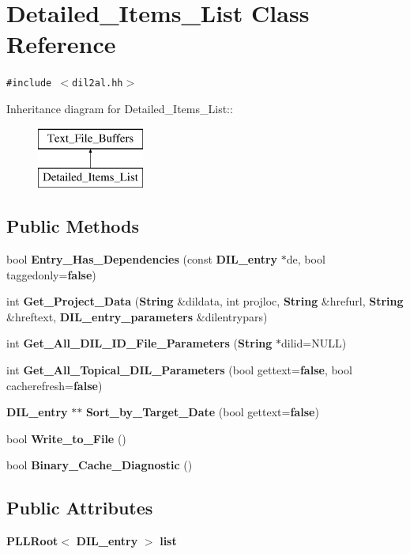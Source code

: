 \section{Detailed\_\-Items\_\-List  Class Reference}
\label{classDetailed__Items__List}
{\tt \#include $<$dil2al.hh$>$}

Inheritance diagram for Detailed\_\-Items\_\-List::\begin{figure}[H]
\begin{center}
\leavevmode
\includegraphics[height=2cm]{classDetailed__Items__List}
\end{center}
\end{figure}
\subsection*{Public Methods}
\begin{CompactItemize}
\item 
bool {\bf Entry\_\-Has\_\-Dependencies} (const {\bf DIL\_\-entry} $\ast$de, bool taggedonly={\bf false})
\item 
int {\bf Get\_\-Project\_\-Data} ({\bf String} \&dildata, int projloc, {\bf String} \&hrefurl, {\bf String} \&hreftext, {\bf DIL\_\-entry\_\-parameters} \&dilentrypars)
\item 
int {\bf Get\_\-All\_\-DIL\_\-ID\_\-File\_\-Parameters} ({\bf String} $\ast$dilid=NULL)
\item 
int {\bf Get\_\-All\_\-Topical\_\-DIL\_\-Parameters} (bool gettext={\bf false}, bool cacherefresh={\bf false})
\item 
{\bf DIL\_\-entry} $\ast$$\ast$ {\bf Sort\_\-by\_\-Target\_\-Date} (bool gettext={\bf false})
\item 
bool {\bf Write\_\-to\_\-File} ()
\item 
bool {\bf Binary\_\-Cache\_\-Diagnostic} ()
\end{CompactItemize}
\subsection*{Public Attributes}
\begin{CompactItemize}
\item 
{\bf PLLRoot}$<$ {\bf DIL\_\-entry} $>$ {\bf list}
\end{CompactItemize}
